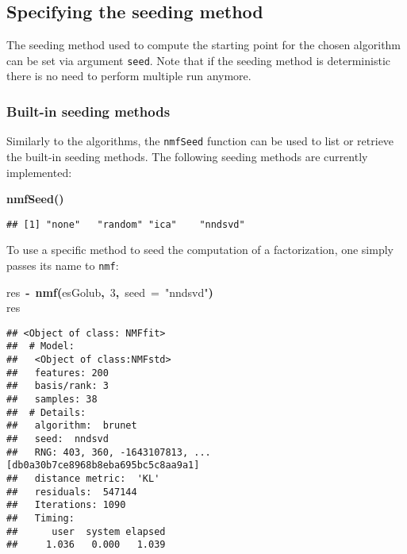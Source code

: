 \documentclass[a4paper]{article}\usepackage{graphicx, color}
\makeatletter
\newcommand{\hlnumber}[1]{\textcolor[rgb]{0,0,0}{#1}}%
\newcommand{\hlfunctioncall}[1]{\textcolor[rgb]{0.501960784313725,0,0.329411764705882}{\textbf{#1}}}%
\newcommand{\hlstring}[1]{\textcolor[rgb]{0.6,0.6,1}{#1}}%
\newcommand{\hlkeyword}[1]{\textcolor[rgb]{0,0,0}{\textbf{#1}}}%
\newcommand{\hlargument}[1]{\textcolor[rgb]{0.690196078431373,0.250980392156863,0.0196078431372549}{#1}}%
\newcommand{\hlassignement}[1]{\textcolor[rgb]{0,0,0}{\textbf{#1}}}%
\newcommand{\hlsymbol}[1]{\textcolor[rgb]{0,0,0}{#1}}%
\newcommand{\hlstd}[1]{\textcolor[rgb]{0,0,0}{#1}}%
\newenvironment{kframe}{%
 \def\FrameCommand##1{\hskip\@totalleftmargin \hskip-\fboxsep
 \colorbox{shadecolor}{##1}\hskip-\fboxsep
     \hskip-\linewidth \hskip-\@totalleftmargin \hskip\columnwidth}%
 \MakeFramed {\advance\hsize-\width
   \@totalleftmargin\z@ \linewidth\hsize
   \@setminipage}}%
 {\par\unskip\endMakeFramed}
\newenvironment{knitrout}{}{} %
\let\code=\texttt
\makeatother
\begin{document}
\subsection{Specifying the seeding method}\label{sec:seed}
The seeding method used to compute the starting point for the chosen algorithm can be set via argument \code{seed}. 
Note that if the seeding method is deterministic there is no need to perform multiple run anymore.

\subsubsection{Built-in seeding methods}
Similarly to the algorithms, the \code{nmfSeed} function can be used to list or retrieve the built-in seeding methods.
The following seeding methods are currently implemented:

\begin{knitrout}
\color{fgcolor}\begin{kframe}
\begin{flushleft}
\ttfamily\noindent
\hlfunctioncall{nmfSeed}\hlkeyword{(}\hlkeyword{)}\mbox{}
\normalfont
\end{flushleft}
\begin{verbatim}
## [1] "none"   "random" "ica"    "nndsvd"
\end{verbatim}
\end{kframe}
\end{knitrout}


To use a specific method to seed the computation of a factorization, one simply passes its name to \code{nmf}:

\begin{knitrout}
\color{fgcolor}\begin{kframe}
\begin{flushleft}
\ttfamily\noindent
\hlsymbol{res}{\ }\hlassignement{\usebox{\hlnormalsizeboxlessthan}-}{\ }\hlfunctioncall{nmf}\hlkeyword{(}\hlsymbol{esGolub}\hlkeyword{,}{\ }\hlnumber{3}\hlkeyword{,}{\ }\hlargument{seed}{\ }\hlargument{=}{\ }\hlstring{"{}nndsvd"{}}\hlkeyword{)}\hspace*{\fill}\\
\hlstd{}\hlsymbol{res}\mbox{}
\normalfont
\end{flushleft}
\begin{verbatim}
## <Object of class: NMFfit>
##  # Model:
##   <Object of class:NMFstd>
##   features: 200 
##   basis/rank: 3 
##   samples: 38 
##  # Details:
##   algorithm:  brunet 
##   seed:  nndsvd 
##   RNG: 403, 360, -1643107813, ... [db0a30b7ce8968b8eba695bc5c8aa9a1]
##   distance metric:  'KL' 
##   residuals:  547144 
##   Iterations: 1090 
##   Timing:
##      user  system elapsed 
##     1.036   0.000   1.039 
\end{verbatim}
\end{kframe}
\end{knitrout}
\end{document}
